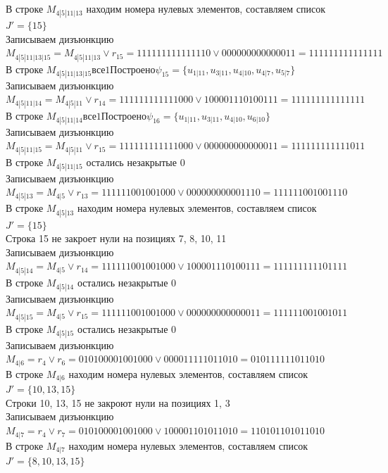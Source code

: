 \documentclass[12pt,a4paper]{report}
\begin{document}
В строке $M_{4 | 5 | 11 | 13}$ находим номера нулевых элементов, составляем список $J' = \{15\}$ \\
Записываем дизъюнкцию $M_{4 | 5 | 11 | 13 | 15} = M_{4 | 5 | 11 | 13}\vee r_{15} = 111111111111110 \vee 000000000000011 = 111111111111111$ \\
В строке $M_{4 | 5 | 11 | 13 | 15} все 1 Построено \psi_{15} = \{u_{1 | 11},u_{3 | 11},u_{4 | 10},u_{4 | 7},u_{5 | 7}\}$ \\
Записываем дизъюнкцию $M_{4 | 5 | 11 | 14} = M_{4 | 5 | 11}\vee r_{14} = 111111111111000 \vee 100001110100111 = 111111111111111$ \\
В строке $M_{4 | 5 | 11 | 14} все 1 Построено \psi_{16} = \{u_{1 | 11},u_{3 | 11},u_{4 | 10},u_{6 | 10}\}$ \\
Записываем дизъюнкцию $M_{4 | 5 | 11 | 15} = M_{4 | 5 | 11}\vee r_{15} = 111111111111000 \vee 000000000000011 = 111111111111011$ \\
В строке $M_{4 | 5 | 11 | 15}$ остались незакрытые $0$ \\
Записываем дизъюнкцию $M_{4 | 5 | 13} = M_{4 | 5}\vee r_{13} = 111111001001000 \vee 000000000001110 = 111111001001110$ \\
В строке $M_{4 | 5 | 13}$ находим номера нулевых элементов, составляем список $J' = \{15\}$ \\
Строка 15 не закроет нули на позициях 7, 8, 10, 11 \\
Записываем дизъюнкцию $M_{4 | 5 | 14} = M_{4 | 5}\vee r_{14} = 111111001001000 \vee 100001110100111 = 111111111101111$ \\
В строке $M_{4 | 5 | 14}$ остались незакрытые $0$ \\
Записываем дизъюнкцию $M_{4 | 5 | 15} = M_{4 | 5}\vee r_{15} = 111111001001000 \vee 000000000000011 = 111111001001011$ \\
В строке $M_{4 | 5 | 15}$ остались незакрытые $0$ \\
Записываем дизъюнкцию $M_{4 | 6} = r_{4}\vee r_{6} = 010100001001000 \vee 000011111011010 = 010111111011010$ \\
В строке $M_{4 | 6}$ находим номера нулевых элементов, составляем список $J' = \{10, 13, 15\}$ \\
Строки 10, 13, 15 не закроют нули на позициях 1, 3 \\
Записываем дизъюнкцию $M_{4 | 7} = r_{4}\vee r_{7} = 010100001001000 \vee 100001101011010 = 110101101011010$ \\
В строке $M_{4 | 7}$ находим номера нулевых элементов, составляем список $J' = \{8, 10, 13, 15\}$ \\
\end{document}
